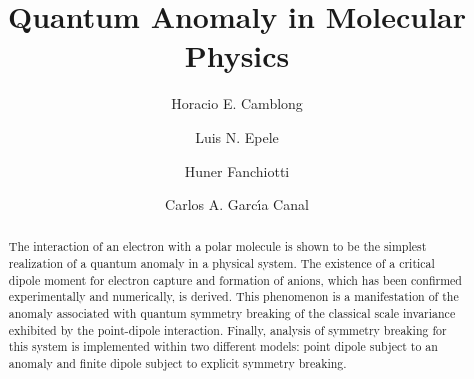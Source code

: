 \documentclass[a4paper,twocolumn,
showpacs,amssymb,aps,prl,superscriptaddress]{revtex4}%
\begin{document}
\title{Quantum Anomaly in Molecular Physics}


\author{Horacio E. Camblong}


\author{Luis N. Epele}

\author{Huner Fanchiotti}

 \author{Carlos A. Garc\'{\i}a Canal}


\begin{abstract}
The interaction of an electron with a polar molecule is shown to
be the simplest realization of a quantum anomaly in a physical
system. The existence of a critical dipole moment
for electron capture and formation of anions, which has been
confirmed experimentally and numerically, is derived. This
phenomenon is a manifestation of the anomaly associated with quantum symmetry
breaking of the classical scale invariance exhibited by the
point-dipole interaction. Finally, analysis of symmetry breaking for this
system is implemented within two different models: point dipole
subject to an anomaly and finite dipole subject to explicit
symmetry breaking. 
\end{abstract}



\maketitle
\end{document}

